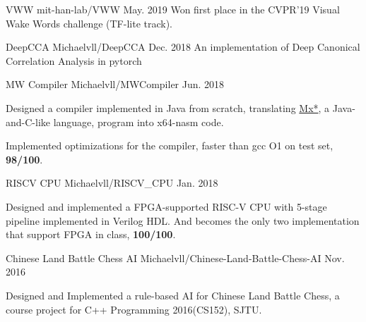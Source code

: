 


\begin{cventries}

\cvproject
{VWW}
{mit-han-lab/VWW}
{May. 2019}
{Won first place in the CVPR'19 Visual Wake Words challenge (TF-lite track).}

\cvproject
{DeepCCA}
{Michaelvll/DeepCCA}
{Dec. 2018}
{An implementation of Deep Canonical Correlation Analysis in pytorch}

\cvproject
{MW Compiler}
{Michaelvll/MWCompiler}
{Jun. 2018}
{
	\begin{cvitems}
        \item {Designed a compiler implemented in Java from scratch, translating \href{https://acm.sjtu.edu.cn/w/images/3/30/M_language_manual.pdf}{Mx*}, a Java-and-C-like language, program into x64-nasm code.}
        \item {Implemented optimizations for the compiler, faster than gcc O1 on test set, \textbf{98/100}.}
	\end{cvitems}
}

\cvproject
{RISCV CPU}
{Michaelvll/RISCV\_CPU}
{Jan. 2018}
{
	\begin{cvitems}
		\item {Designed and implemented a FPGA-supported RISC-V CPU with 5-stage pipeline implemented in Verilog HDL. And becomes the only two implementation that support FPGA in class, \textbf{100/100}.}
	\end{cvitems}
}

\cvproject
{Chinese Land Battle Chess AI}
{Michaelvll/Chinese-Land-Battle-Chess-AI}
{Nov. 2016}
{
    \begin{cvitems}
        \item {Designed and Implemented a rule-based AI for Chinese Land Battle Chess, a  course project for  C++ Programming 2016(CS152), SJTU.}
    \end{cvitems}
}

\end{cventries}
